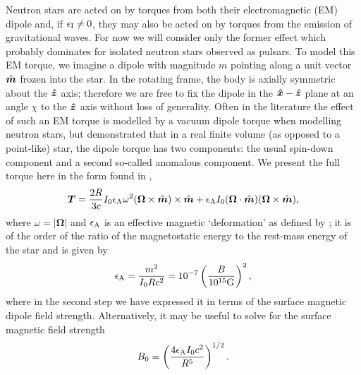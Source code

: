 \documentclass[../full_thesis/full_thesis.tex]{subfiles}
\begin{document}
Neutron stars are acted on by torques from both their electromagnetic (EM)
dipole and, if $\epsilon_{\mathrm{I}} \ne 0$, they may also be acted on by torques from the
emission of gravitational waves. For now we will consider only the former
effect which probably dominates for isolated neutron stars observed as pulsars.
To model this EM torque, we imagine a dipole with magnitude $m$ pointing along
a unit vector $\hat{\boldsymbol{m}}$ frozen into the star. In the rotating frame, the body is
axially symmetric about the $\boldsymbol{\hat{z}}$ axis; therefore we are free to fix the dipole
in the $\boldsymbol{\hat{x}}-\boldsymbol{\hat{z}}$ plane at an angle $\chi$ to the $\boldsymbol{\hat{z}}$ axis without loss of
generality. Often in the literature the effect of such an EM torque is modelled
by a vacuum dipole torque when modelling neutron stars, but \citet{Deutsch1955}
demonstrated that in a real finite volume (as opposed to a point-like) star,
the dipole torque has two components: the usual spin-down component and a
second so-called anomalous component. We present the full torque here in the
form found in \citet{Goldreich1970},
\begin{equation}
\boldsymbol{T}=\frac{2R}{3c} I_{0}\epsilon_{\mathrm{A}}\omega^{2}
               (\mathbf{\Omega} \times \hat{\boldsymbol{m}})\times \hat{\boldsymbol{m}}
               + \epsilon_{\mathrm{A}} I_{0}(\mathbf{\Omega} \cdot \hat{\boldsymbol{m}})
               (\mathbf{\Omega} \times \hat{\boldsymbol{m}}),
\label{eqn: torque}
\end{equation}
where $\omega=|\mathbf{\Omega}|$ and $\epsilon_{\mathrm{A}}$ is an effective magnetic
`deformation' as defined by \citet{Glampedakis2010}; it is of the order of
the ratio of the magnetostatic energy to the rest-mass energy of the star and
is given by
\begin{align}
\epsilon_{\mathrm{A}} = \frac{m^{2}}{I_{0}R c^{2}} = 10^{-7} \left(\frac{B}{10^{15}\textrm G}\right)^{2},
\end{align}
where in the second step we have expressed it in terms of the surface magnetic
dipole field strength. Alternatively, it may be useful to solve for the surface
magnetic field strength
\begin{equation}
    B_{0} = \left(\frac{4 \epsilon_{\mathrm{A}} I_{0} c^{2}}{R^{5}}\right)^{1/2}.
    \label{eqn: magnetic field epsA}
\end{equation}
\end{document}
